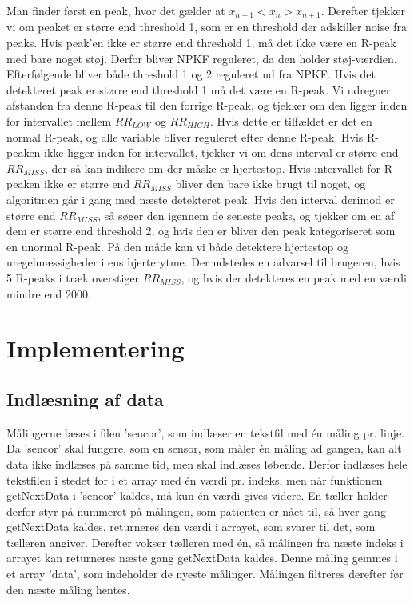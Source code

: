 \documentclass{article}
\begin{document}
Man finder først en peak, hvor det gælder at $x_{n-1} < x_n > x_{n+1}$. Derefter tjekker vi om peaket er større end threshold 1, som er en threshold der adskiller noise fra peaks. Hvis peak’en ikke er større end threshold 1, må det ikke være en R-peak med bare noget støj. Derfor bliver NPKF reguleret, da den holder støj-værdien. Efterfølgende bliver både threshold 1 og 2 reguleret ud fra NPKF. Hvis det detekteret peak er større end threshold 1 må det være en R-peak. Vi udregner afstanden fra denne R-peak til den forrige R-peak, og tjekker om den ligger inden for intervallet mellem $RR_{LOW}$ og $RR_{HIGH}$. Hvis dette er tilfældet er det en normal R-peak, og alle variable bliver reguleret efter denne R-peak. Hvis R-peaken ikke ligger inden for intervallet, tjekker vi om dens interval er større end $RR_{MISS}$, der så kan indikere om der måske er hjertestop. Hvis intervallet for R-peaken ikke er større end $RR_{MISS}$ bliver den bare ikke brugt til noget, og algoritmen går i gang med næste detekteret peak. Hvis den interval derimod er større end $RR_{MISS}$, så søger den igennem de seneste peaks, og tjekker om en af dem er større end threshold 2, og hvis den er bliver den peak kategoriseret som en unormal R-peak. På den måde kan vi både detektere hjertestop og uregelmæssigheder i ens hjerterytme. 
Der udstedes en advarsel til brugeren, hvis 5 R-peaks i træk overstiger $RR_{MISS}$, og hvis der detekteres en peak med en værdi mindre end 2000.

\section{Implementering}

\subsection{Indlæsning af data}
Målingerne læses i filen ’sencor’, som indlæser en tekstfil med én måling pr. linje. Da ’sencor’ skal fungere, som en sensor, som måler én måling ad gangen, kan alt data ikke indlæses på samme tid, men skal indlæses løbende. Derfor indlæses hele tekstfilen i stedet for i et array med én værdi pr. indeks, men når funktionen getNextData i ’sencor’  kaldes, må kun én værdi gives videre. En tæller holder derfor styr på nummeret på målingen, som patienten er nået til, så hver gang getNextData kaldes, returneres den værdi i arrayet, som svarer til det, som tælleren angiver. Derefter vokser tælleren med én, så målingen fra næste indeks i arrayet kan returneres næste gang getNextData kaldes. Denne måling gemmes i et array ’data’, som indeholder de nyeste målinger. Målingen filtreres derefter før den næste måling hentes.
\end{document}
